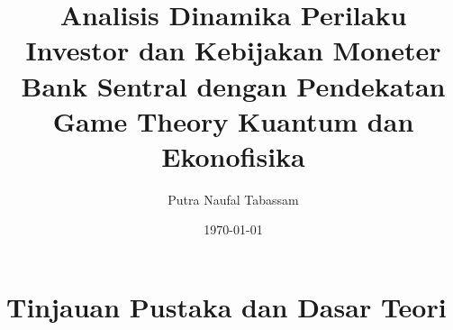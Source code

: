 \documentclass{article}
\title{Analisis Dinamika Perilaku Investor dan Kebijakan Moneter Bank Sentral dengan Pendekatan Game Theory Kuantum dan Ekonofisika}
\author{Putra Naufal Tabassam}
\date{\today}
\begin{document}
\maketitle

\tableofcontents
\newpage


\newpage
\section{Tinjauan Pustaka dan Dasar Teori}





\newpage

\newpage

\end{document}
